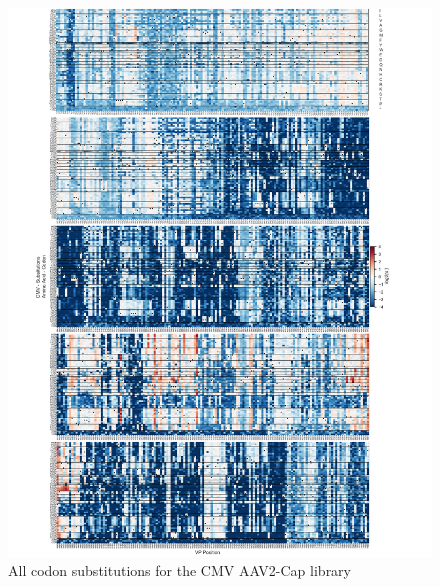 \begin{figure}
\includegraphics[width=\textwidth,height=\textheight]{figures/20180903_AAV2_supp_fig1_CMV_subs.pdf}
\caption[All codon substitutions for the CMV AAV2-Cap  library]{All codon substitutions for the CMV AAV2-Cap  library
\label{fig:Figure 6}}
\end{figure}


